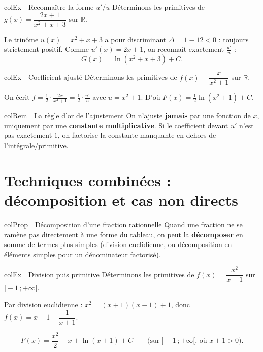 \documentclass[11pt,a4paper]{article}
\newenvironment{propriete}[1][Propriété]
  {\begin{fiche}{colProp}{\ding{72}~~#1}}{\end{fiche}}
\newenvironment{exemple}[1][Exemple]
  {\begin{fiche}{colEx}{\ding{217}~~#1}}{\end{fiche}}
\newenvironment{remarque}[1][Remarque]
  {\begin{fiche}{colRem}{\ding{43}~~#1}}{\end{fiche}}
\begin{document}
\begin{exemple}[Reconnaître la forme $u'/u$]
Déterminons les primitives de $g(x)=\dfrac{2x+1}{x^2+x+3}$ sur $\mathbb{R}$.

\smallskip
Le trinôme $u(x)=x^2+x+3$ a pour discriminant $\Delta=1-12<0$ : toujours strictement positif. Comme $u'(x)=2x+1$, on reconnaît exactement $\frac{u'}{u}$ :
\[
  G(x)=\ln\left(x^2+x+3\right)+C.
\]
\end{exemple}

\begin{exemple}[Coefficient ajusté]
Déterminons les primitives de $f(x)=\dfrac{x}{x^2+1}$ sur $\mathbb{R}$.

\smallskip
On écrit $f=\frac12\cdot\frac{2x}{x^2+1}=\frac12\cdot\frac{u'}{u}$ avec $u=x^2+1$. D'où $F(x)=\frac12\ln(x^2+1)+C$.
\end{exemple}

\begin{remarque}[La règle d'or de l'ajustement]
On n'ajuste \textbf{jamais} par une fonction de $x$, uniquement par une \textbf{constante multiplicative}. Si le coefficient devant $u'$ n'est pas exactement $1$, on factorise la constante manquante en dehors de l'intégrale/primitive.
\end{remarque}

\section{Techniques combinées : décomposition et cas non directs}

\begin{propriete}[Décomposition d'une fraction rationnelle]
Quand une fraction ne se ramène pas directement à une forme du tableau, on peut la \textbf{décomposer} en somme de termes plus simples (division euclidienne, ou décomposition en éléments simples pour un dénominateur factorisé).
\end{propriete}

\begin{exemple}[Division puis primitive]
Déterminons les primitives de $f(x)=\dfrac{x^2}{x+1}$ sur $]-1\,;+\infty[$.

\smallskip
Par division euclidienne : $x^2 = (x+1)(x-1)+1$, donc $f(x)=x-1+\dfrac{1}{x+1}$.

\smallskip
\[
  F(x) = \frac{x^2}{2}-x+\ln(x+1)+C \qquad\text{(sur }]-1\,;+\infty[\text{, où }x+1>0\text{)}.
\]
\end{exemple}
\end{document}
